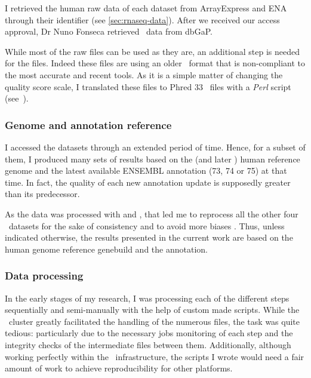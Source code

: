 I retrieved the human raw data of each dataset from \gls{ArrayExpress} and
\gls{ENA} through their identifier (see \cref{sec:rnaseq-data}). After we
received our access approval, Dr Nuno Fonseca retrieved \Gtex\ data from
\gls{dbGaP}.

While most of the raw files can be used as they are, an additional step is
needed for the  files. Indeed these files are using an older
\fastq\ format that is non-compliant to the most accurate and recent tools.
As it is a simple matter of changing the quality score scale,
I translated these files to \gls{Phred} $33$ \fastq\ files with a
\emph{\gls{Perl}} script (see~).

\subsubsection{Genome and annotation reference}

I accessed the datasets through an extended period of time. Hence, for a subset of
them, I produced many sets of results based on the 
(and later )  human reference genome and the latest available ENSEMBL
annotation (73, 74 or 75) at that time.
In fact, the quality of each new annotation update is
supposedly greater than its predecessor.

As the  data was processed with  and , that led me
to reprocess all the other four \Rnaseq\ datasets for the sake of consistency and
to avoid more biases . Thus, unless indicated
otherwise, the results presented in the current work are
based on the  human genome reference genebuild and the 
annotation.


\subsubsection{Data processing}

In the early stages of my research, I was processing each of the different steps
sequentially and semi-manually with the help of custom made scripts. While the
\EBI\ \gls{cluster} greatly facilitated the handling of the numerous files,
the task was quite tedious: particularly due to the necessary jobs monitoring of
each step and the integrity checks of the intermediate files between them.
Additionally, although working perfectly within the \EBI\ infrastructure,
the scripts I wrote would need a fair amount of work to achieve reproducibility
for other platforms.

